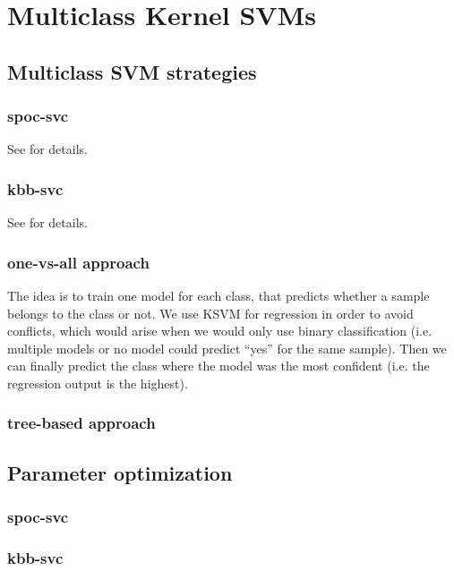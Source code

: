 
\section{Multiclass Kernel SVMs}


\subsection{Multiclass SVM strategies}

\subsubsection{spoc-svc}

See \cite{spoc-svc} for details.


\subsubsection{kbb-svc}

See \cite{kbb-svc} for details.


\subsubsection{one-vs-all approach}

The idea is to train one model for each class, that predicts whether a sample belongs to the class or not.
We use KSVM for regression in order to avoid conflicts, which would arise when we would only use binary classification
(i.e. multiple models or no model could predict ``yes'' for the same sample).
Then we can finally predict the class where the model was the most confident (i.e. the regression output is the highest).

\subsubsection{tree-based approach}



\subsection{Parameter optimization}

\subsubsection{spoc-svc}

\subsubsection{kbb-svc}

